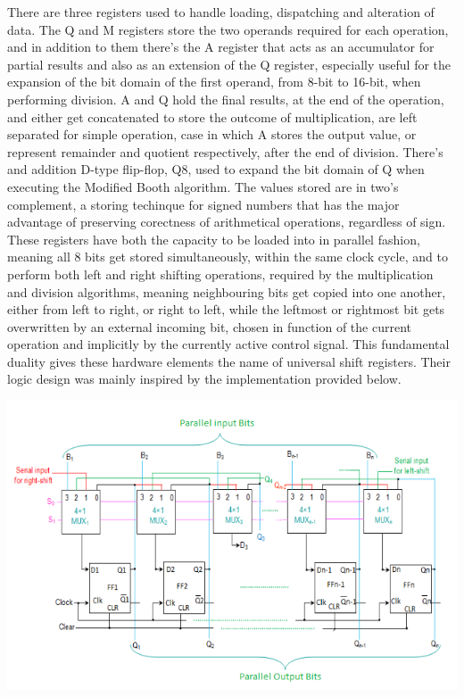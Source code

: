\documentclass[12pt, letterpaper]{article}
\begin{document}
There are three registers used to handle loading, dispatching and alteration of data. The Q and M registers store the two operands required for each operation, and
in addition to them there's the A register that acts as an accumulator for partial results and also as an extension of the Q register, especially useful
for the expansion of the bit domain of the first operand, from 8-bit to 16-bit, when performing division. A and Q hold the final results, at the end of the
operation, and either get concatenated to store the outcome of multiplication, are left separated for simple operation, case in which A stores the output
value, or represent remainder and quotient respectively, after the end of division. There's and addition D-type flip-flop, Q8, used to expand the bit
domain of Q when executing the Modified Booth algorithm.
The values stored are in two's complement, a storing
techinque for signed numbers that has the major advantage of preserving corectness of arithmetical operations, regardless of sign. These registers have both
the capacity to be loaded into in parallel fashion, meaning all 8 bits get stored simultaneously, within the same clock cycle, and to perform both left and right
shifting operations, required by the multiplication and division algorithms, meaning neighbouring bits get copied into one another, either from
left to right, or right to left, while the leftmost or rightmost bit gets overwritten by an external incoming bit, chosen in function of the current
operation and implicitly by the currently active control signal. This fundamental duality gives these hardware elements the name of universal shift registers. Their
logic design was mainly inspired by the implementation provided below. 

\begin{center}
\includegraphics[scale=0.8]{Documentation/registers}
\end{center}
\end{document}
